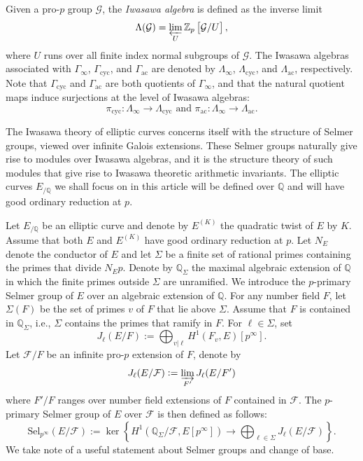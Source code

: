 \documentclass[12pt]{amsart}
\newcommand{\Q}{\mathbb{Q}}
\newcommand{\op}[1]{\operatorname{#1}}
\numberwithin{equation}{section}
\begin{document}
\par Given a pro-$p$ group $\mathcal{G}$, the \textit{Iwasawa algebra} is defined as the inverse limit
\[
\Lambda(\mathcal{G}) = \varprojlim_U \mathbb{Z}_p\left[\mathcal{G}/U\right],
\]
where $U$ runs over all finite index normal subgroups of $\mathcal{G}$. The Iwasawa algebras associated with $\Gamma_\infty$, $\Gamma_{\mathrm{cyc}}$, and $\Gamma_{\mathrm{ac}}$ are denoted by $\Lambda_\infty$, $\Lambda_{\mathrm{cyc}}$, and $\Lambda_{\mathrm{ac}}$, respectively. Note that $\Gamma_{\op{cyc}}$ and $\Gamma_{\op{ac}}$ are both quotients of $\Gamma_\infty$, and that the natural quotient maps induce surjections at the level of Iwasawa algebras:
\[\pi_{\op{cyc}}: \Lambda_\infty\rightarrow \Lambda_{\op{cyc}}\text{ and }\pi_{\op{ac}}: \Lambda_\infty\rightarrow \Lambda_{\op{ac}}.\]
\par The Iwasawa theory of elliptic curves concerns itself with the structure of Selmer groups, viewed over infinite Galois extensions. These Selmer groups naturally give rise to modules over Iwasawa algebras, and it is the structure theory of such modules that give rise to Iwasawa theoretic arithmetic invariants. The elliptic curves $E_{/\Q}$ we shall focus on in this article will be defined over $\Q$ and will have good ordinary reduction at $p$.
\par Let $E_{/\mathbb{Q}} $ be an elliptic curve and denote by $ E^{(K)} $ the quadratic twist of $ E $ by $ K $. Assume that both $E$ and $E^{(K)}$ have good ordinary reduction at $p$. Let $ N_E $ denote the conductor of $ E $ and let $\Sigma$ be a finite set of rational primes containing the primes that divide $ N_E p $. Denote by $\Q_\Sigma$ the maximal algebraic extension of $\Q$ in which the finite primes outside $\Sigma$ are unramified. We introduce the $p$-primary Selmer group of $E$ over an algebraic extension of $\Q$. For any number field $ F $, let $\Sigma(F)$ be the set of primes $ v $ of $ F $ that lie above $\Sigma$. Assume that $F$ is contained in $\Q_\Sigma$, i.e., $\Sigma$ contains the primes that ramify in $F$. For $\ell \in \Sigma$, set
\[
J_\ell(E/F) := \bigoplus_{v|\ell} H^1(F_v, E)[p^\infty].
\]
Let $ \mathcal{F}/F$ be an infinite pro-$p$ extension of $F$, denote by \[J_\ell(E/\mathcal{F}):=\varinjlim_{F'} J_\ell(E/F')\]where $ F'/F$ ranges over number field extensions of $F$ contained in $\mathcal{F}$. The $ p $-primary Selmer group of $ E $ over $ \mathcal{F} $ is then defined as follows:
\[
\mathrm{Sel}_{p^\infty} (E/\mathcal{F}) := \ker\left\{H^1(\Q_\Sigma/\mathcal{F}, E[p^\infty]) \longrightarrow \bigoplus_{\ell \in \Sigma} J_\ell(E/\mathcal{F})\right\}.
\]
We take note of a useful statement about Selmer groups and change of base.
\end{document}
